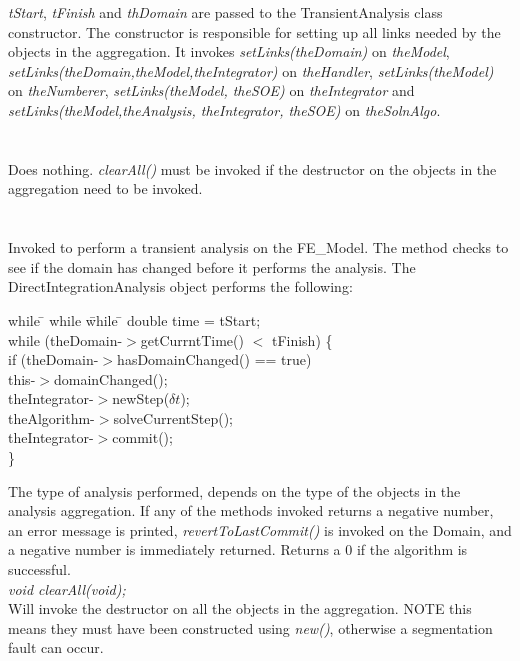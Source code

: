 {\em tStart}, {\em tFinish} and {\em thDomain} are passed to the
TransientAnalysis class constructor. The constructor is responsible
for setting up all links needed by the objects in the aggregation. It
invokes {\em setLinks(theDomain)} on {\em theModel}, {\em
setLinks(theDomain,theModel,theIntegrator)} on {\em theHandler}, 
{\em setLinks(theModel)} on {\em theNumberer},  {\em
setLinks(theModel, theSOE)} on {\em theIntegrator} and  {\em
setLinks(theModel,theAnalysis, theIntegrator, theSOE)} on {\em
theSolnAlgo}. \\

 \\
\\ 
Does nothing. {\em clearAll()} must be invoked if the destructor on
the objects in the aggregation need to be invoked. \\

\\
 \\
Invoked to perform a transient analysis on the FE\_Model. The method
checks to see if the domain has changed before it performs the
analysis. The DirectIntegrationAnalysis object performs the following:
\begin{tabbing}
while \= \+ while \= while \= \kill
    double time = tStart; \\
    while (theDomain-$>$getCurrntTime() $<$ tFinish) \{ \+ \\
       if (theDomain-$>$hasDomainChanged() == true) \+\\
           this-$>$domainChanged(); \- \\

	theIntegrator-$>$newStep($\delta t$); \\
	theAlgorithm-$>$solveCurrentStep(); \\
        theIntegrator-$>$commit(); \- \\
    \}
\end{tabbing}
\noindent The type of analysis performed, depends on the type of the
objects in the analysis aggregation. If any of the methods invoked
returns a negative number, an error message is printed, {\em
revertToLastCommit()} is invoked on the Domain, and a negative number
is immediately returned. Returns a $0$ if the algorithm is successful. \\

{\em void clearAll(void);} \\
Will invoke the destructor on all the objects in the aggregation. NOTE
this means they must have been constructed using {\em new()},
otherwise a segmentation fault can occur.\\

